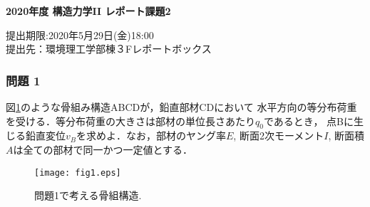 \documentclass[10pt,a4j]{jarticle}
\newlength{\minitwocolumn}
\begin{document}
\newcommand{\fat}[1]{\mbox{\boldmath $#1$}}
\newcommand{\D}{\partial}
\newcommand{\w}{\omega}
\newcommand{\ga}{\alpha}
\newcommand{\gb}{\beta}
\newcommand{\gx}{\xi}
\newcommand{\gz}{\zeta}
\newcommand{\vhat}[1]{\hat{\fat{#1}}}
\newcommand{\spc}{\vspace{0.7\baselineskip}}
\newcommand{\halfspc}{\vspace{0.3\baselineskip}}

\newcommand{\twofig}[2]
 {
   \begin{figure}[h]
     \begin{minipage}[t]{\minitwocolumn}
         \begin{center}   #1
         \end{center}
     \end{minipage}
         \hspace{\columnsep}
     \begin{minipage}[t]{\minitwocolumn}
         \begin{center} #2
         \end{center}
     \end{minipage}
   \end{figure}
 }
\begin{center}
{\Large \bf 2020年度 構造力学II レポート課題2} \\
\end{center}
\begin{flushright}
	提出期限:2020年5月29日(金)18:00\\
	提出先：環境理工学部棟３Fレポートボックス
\end{flushright}
\vspace{10mm}
\subsubsection*{問題 1}
図\ref{fig:fig1}のような骨組み構造ABCDが，鉛直部材CDにおいて
水平方向の等分布荷重を受ける．等分布荷重の大きさは部材の単位長さあたり$q_0$であるとき，
点Bに生じる鉛直変位$v_B$を求めよ．なお，部材のヤング率$E$, 断面2次モーメント$I$, 
断面積$A$は全ての部材で同一かつ一定値とする．
\begin{figure}[h]
	\begin{center}
	\texttt{[image: fig1.eps]} 
	\end{center}
	\caption{問題1で考える骨組構造.} 
	\label{fig:fig1}
\end{figure}
\newpage
\end{document}
